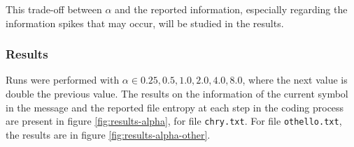 \documentclass{article}
\begin{document}
This trade-off between $\alpha$ and the reported information, especially regarding the information spikes that may occur, will be studied in the results.

\subsubsection{Results}

Runs were performed with $\alpha \in {0.25, 0.5, 1.0, 2.0, 4.0, 8.0}$, where the next value is double the previous value.
The results on the information of the current symbol in the message and the reported file entropy at each step in the coding process are
present in figure \ref{fig:results-alpha}, for file \verb|chry.txt|.
For file \verb|othello.txt|, the results are in figure \ref{fig:results-alpha-other}.
\end{document}
